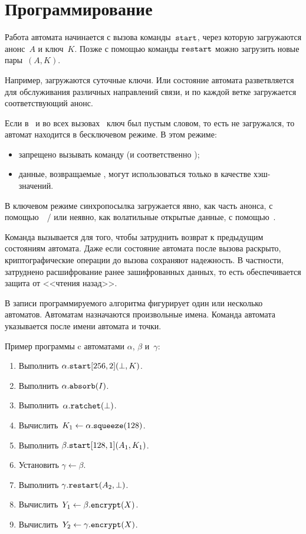 \section{Программирование}\label{PRG.Rules}

Работа автомата начинается с вызова команды~$\texttt{start}$,
через которую загружаются анонс~$A$ и ключ~$K$. 
%
Позже с помощью команды $\texttt{restart}$ можно загрузить новые пары~$(A,K)$.

Например, загружаются суточные ключи. Или состояние автомата
разветвляется для обслуживания различных направлений связи, 
и по каждой ветке загружается соответствующий анонс. 
\fi

Если в~ и во всех вызовах~ ключ был пустым словом, 
то есть не загружался, то автомат находится в бесключевом режиме.
%
В этом режиме:
\begin{itemize}
\item
запрещено вызывать команду  (и соответственно );
\item
данные, возвращаемые , могут использоваться только 
в качестве хэш-значений.
\end{itemize}

В ключевом режиме синхропосылка загружается явно, как часть анонса, с 
помощью~~/  или неявно, как волатильные 
открытые данные, с помощью~.

Команда  вызывается для того, чтобы затруднить возврат к
предыдущим состояниям автомата. Даже если состояние автомата после вызова
 раскрыто, криптографические операции до вызова сохраняют
надежность. В частности, затруднено расшифрование ранее зашифрованных данных,
то есть обеспечивается защита от <<чтения назад>>.

В записи программируемого алгоритма фигурирует один или несколько автоматов.
Автоматам назначаются произвольные имена. Команда автомата указывается после 
имени автомата и точки. 

Пример программы c автоматами $\alpha$, $\beta$ и~$\gamma$:
\begin{enumerate}
\item
Выполнить $\alpha.\texttt{start}[256, 2](\perp,K)$.
\item
Выполнить $\alpha.\texttt{absorb}(I)$.
\item
Выполнить~$\alpha.\texttt{ratchet}(\perp)$.
\item
Вычислить~$K_1\leftarrow\alpha.\texttt{squeeze}(128)$.
\item
Выполнить $\beta.\texttt{start}[128, 1](A_1, K_1)$.
\item
Установить $\gamma\leftarrow\beta$.
\item
Выполнить $\gamma.\texttt{restart}(A_2,\perp)$.
\item
Вычислить~$Y_1\leftarrow\beta.\texttt{encrypt}(X)$.
\item
Вычислить~$Y_2\leftarrow\gamma.\texttt{encrypt}(X)$.
\end{enumerate}

